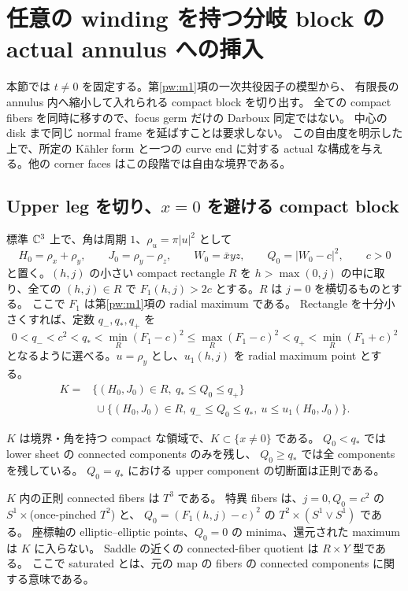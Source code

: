\section{任意の winding を持つ分岐 block の actual annulus への挿入}
\label{ai:section}

本節では $t\ne0$ を固定する。第\ref{pw:m1}項の一次共役因子の模型から、
有限長の annulus 内へ縮小して入れられる compact block を切り出す。
全ての compact fibers を同時に移すので、focus germ だけの Darboux 同定ではない。
中心の disk まで同じ normal frame を延ばすことは要求しない。
この自由度を明示した上で、所定の K\"ahler form と一つの curve end に対する
actual な構成を与える。他の corner faces はこの段階では自由な境界である。

\subsection{Upper leg を切り、$x=0$ を避ける compact block}

標準 $\mathbb C^3$ 上で、角は周期 $1$、$\rho_u=\pi|u|^2$ として
\[
 H_0=\rho_x+\rho_y,\qquad J_0=\rho_y-\rho_z,
 \qquad W_0=\bar x yz,\qquad Q_0=|W_0-c|^2,
 \qquad c>0
\]
と置く。$(h,j)$ の小さい compact rectangle $R$ を
$h>\max(0,j)$ の中に取り、全ての $(h,j)\in R$ で
$F_1(h,j)>2c$ とする。$R$ は $j=0$ を横切るものとする。
ここで $F_1$ は第\ref{pw:m1}項の radial maximum である。
Rectangle を十分小さくすれば、定数 $q_-,q_*,q_+$ を
\begin{equation}\label{ai:q-window}
 0<q_-<c^2<q_*<\min_R(F_1-c)^2
 \le\max_R(F_1-c)^2<q_+<\min_R(F_1+c)^2
\end{equation}
となるように選べる。$u=\rho_y$ とし、$u_1(h,j)$ を radial maximum point とする。
\begin{equation}\label{ai:K}
\begin{split}
 K={}&\{(H_0,J_0)\in R,\ q_*\le Q_0\le q_+\}\\
 &\ \cup\{(H_0,J_0)\in R,\ q_-\le Q_0\le q_*,\ u\le u_1(H_0,J_0)\}.
\end{split}
\end{equation}

\begin{proposition}\label{ai:compact-block}
$K$ は境界・角を持つ compact な領域で、$K\subset\{x\ne0\}$ である。
$Q_0<q_*$ では lower sheet の connected components のみを残し、
$Q_0\ge q_*$ では全 components を残している。
$Q_0=q_*$ における upper component の切断面は正則である。

$K$ 内の正則 connected fibers は $T^3$ である。
特異 fibers は、$j=0,Q_0=c^2$ の
$S^1\times$(once-pinched $T^2$) と、
$Q_0=(F_1(h,j)-c)^2$ の $T^2\times(S^1\vee S^1)$ である。
座標軸の elliptic--elliptic points、$Q_0=0$ の minima、還元された maximum は $K$ に入らない。
Saddle の近くの connected-fiber quotient は $R\times Y$ 型である。
ここで saturated とは、元の map の fibers の connected components に関する意味である。
\end{proposition}

